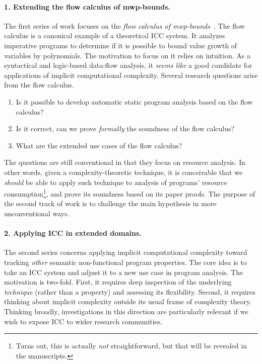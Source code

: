 \paragraph*{1. Extending the flow calculus of mwp-bounds.}
The first series of work focuses on the \emph{flow calculus of mwp-bounds}~\cite{jones2009}.
The flow calculus is a canonical example of a theoretical ICC system.
It analyzes imperative programs to determine if it is possible to bound value growth of variables by polynomials.
The motivation to focus on it relies on intuition.
As a syntactical and logic-based data-flow analysis, it \emph{seems like} a good candidate for applications of implicit computational complexity.
Several research questions arise from the flow calculus.
\begin{enumerate}
\item Is it possible to develop automatic static program analysis based on the flow calculus?
\item Is it correct, \ie can we prove \emph{formally} the soundness of the flow calculus?
\item What are the extended use cases of the flow calculus?
\end{enumerate}
The questions are still conventional in that they focus on resource analysis.
In other words, given a complexity-theoretic technique, it is conceivable that we \emph{should} be able to apply such technique to analysis of programs' resource consumption\footnote{
Turns out, this is actually \emph{not} straightforward, but that will be revealed in the manuscripts.},
and prove its soundness based on its paper proofs.
The purpose of the second track of work is to challenge the main hypothesis in more unconventional ways.

\paragraph*{2. Applying ICC in extended domains.}
The second series concerns applying implicit computational complexity toward tracking \emph{other} semantic non-functional program properties.
The core idea is to take an ICC system and adjust it to a new use case in program analysis.
The motivation is two-fold.
First, it requires deep inspection of the underlying \emph{technique} (rather than a property) and assessing its flexibility.
Second, it requires thinking about implicit complexity outside its usual frame of complexity theory.
Thinking broadly, investigations in this direction are particularly relevant if we wish to expose ICC to wider research communities.

